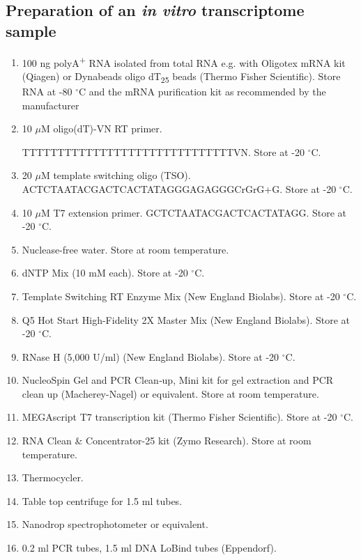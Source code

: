 \documentclass[times, 11pt, a4paper]{article}
\begin{document}
\subsection*{Preparation of an \emph{in vitro} transcriptome sample}
\begin{enumerate}
\item 100 ng polyA\textsuperscript{+} RNA isolated from total RNA e.g. with Oligotex mRNA kit (Qiagen) or Dynabeads oligo dT\textsubscript{25} beads (Thermo Fisher Scientific). Store RNA at -80 $^{\circ}$C and the mRNA purification kit as recommended by the manufacturer

\item 10 $\mu$M oligo(dT)-VN RT primer. 

TTTTTTTTTTTTTTTTTTTTTTTTTTTTTTVN. Store at -20 $^{\circ}$C.

\item 20 $\mu$M template switching oligo (TSO). ACTCTAATACGACTCACTATAGGGAGAGGGCrGrG+G. Store at -20 $^{\circ}$C.

\item 10 $\mu$M T7 extension primer. GCTCTAATACGACTCACTATAGG. Store at -20 $^{\circ}$C.

\item Nuclease-free water. Store at room temperature.

\item dNTP Mix (10 mM each). Store at -20 $^{\circ}$C.

\item Template Switching RT Enzyme Mix (New England Biolabs). Store at -20 $^{\circ}$C.

\item Q5 Hot Start High-Fidelity 2X Master Mix (New England Biolabs). Store at -20 $^{\circ}$C.

\item RNase H (5,000 U/ml) (New England Biolabs). Store at -20 $^{\circ}$C.

\item NucleoSpin Gel and PCR Clean‑up, Mini kit for gel extraction and PCR clean up (Macherey-Nagel) or equivalent. Store at room temperature.

\item MEGAscript T7 transcription kit (Thermo Fisher Scientific). Store at -20 $^{\circ}$C.

\item RNA Clean \& Concentrator-25 kit (Zymo Research). Store at room temperature.

\item Thermocycler.

\item Table top centrifuge for 1.5 ml tubes.

\item Nanodrop spectrophotometer or equivalent.

\item 0.2  ml PCR tubes, 1.5 ml DNA LoBind tubes (Eppendorf).

\end{enumerate}
\end{document}
